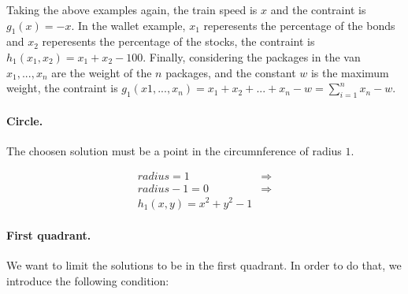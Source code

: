 Taking the above examples again, the train speed is \( x \) and the contraint is \( g_1(x) = -x \). In the wallet example, \( x_1 \) reperesents the percentage of the bonds and \( x_2 \) reperesents the percentage of the stocks, the contraint is \( h_1(x_1, x_2) = x_1 + x_2 - 100 \). Finally, considering the packages in the van \( x_1, ..., x_n \) are the weight of the \( n \) packages, and the constant \( w \) is the maximum weight, the contraint is \( g_1(x1, ..., x_n) = x_1 + x_2 + ... + x_n - w = \sum\limits_{i = 1}^{n} x_n - w \).

\paragraph{Circle.} The choosen solution must be a point in the circumnference of radius \( 1 \). 

\begin{minipage}{0.48\linewidth}
    \center
    \begin{equation*}
        \begin{split}
            \mathit{radius} = 1         & \Rightarrow \\
            \mathit{radius} - 1 = 0     & \Rightarrow \\
            h_1(x, y) = x^2 + y^2 - 1     &
        \end{split}
    \end{equation*}
\end{minipage}
\begin{minipage}{0.5\linewidth}
    \center
\end{minipage}

\paragraph{First quadrant.} We want to limit the solutions to be in the first quadrant. In order to do that, we introduce the following condition:

